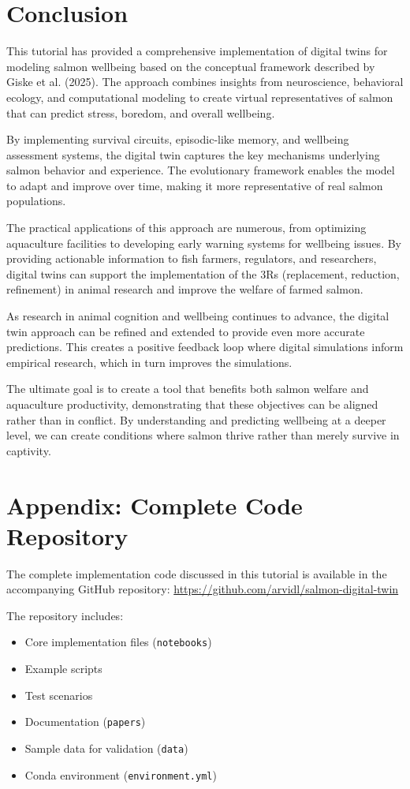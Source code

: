 \documentclass[11pt,a4paper]{article}
\begin{document}
\section{Conclusion}
This tutorial has provided a comprehensive implementation of digital twins for modeling salmon wellbeing based on the conceptual framework described by Giske et al. (2025). The approach combines insights from neuroscience, behavioral ecology, and computational modeling to create virtual representatives of salmon that can predict stress, boredom, and overall wellbeing.

By implementing survival circuits, episodic-like memory, and wellbeing assessment systems, the digital twin captures the key mechanisms underlying salmon behavior and experience. The evolutionary framework enables the model to adapt and improve over time, making it more representative of real salmon populations.

The practical applications of this approach are numerous, from optimizing aquaculture facilities to developing early warning systems for wellbeing issues. By providing actionable information to fish farmers, regulators, and researchers, digital twins can support the implementation of the 3Rs (replacement, reduction, refinement) in animal research and improve the welfare of farmed salmon.

As research in animal cognition and wellbeing continues to advance, the digital twin approach can be refined and extended to provide even more accurate predictions. This creates a positive feedback loop where digital simulations inform empirical research, which in turn improves the simulations.

The ultimate goal is to create a tool that benefits both salmon welfare and aquaculture productivity, demonstrating that these objectives can be aligned rather than in conflict. By understanding and predicting wellbeing at a deeper level, we can create conditions where salmon thrive rather than merely survive in captivity.

\section{Appendix: Complete Code Repository}
The complete implementation code discussed in this tutorial is available in the accompanying GitHub repository: \url{https://github.com/arvidl/salmon-digital-twin}

The repository includes:
\begin{itemize}
    \item Core implementation files (\texttt{notebooks})
    \item Example scripts
    \item Test scenarios
    \item Documentation (\texttt{papers})
    \item Sample data for validation (\texttt{data})
    \item Conda environment (\texttt{environment.yml})
\end{itemize}
\end{document}
